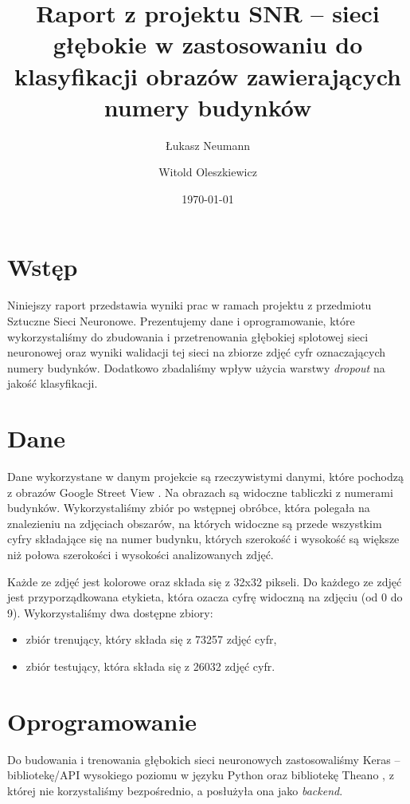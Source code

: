 \documentclass[12pt]{article}
\title{Raport z projektu SNR -- sieci głębokie w zastosowaniu do klasyfikacji obrazów zawierających numery budynków}
\author{
        Łukasz Neumann \\
            \and
        Witold Oleszkiewicz \\
}
\date{\today}
\begin{document}
\maketitle


\section{Wstęp}

Niniejszy raport przedstawia wyniki prac w ramach projektu z przedmiotu Sztuczne Sieci Neuronowe. Prezentujemy dane i oprogramowanie, które wykorzystaliśmy do zbudowania i przetrenowania głębokiej splotowej sieci neuronowej oraz wyniki walidacji tej sieci na zbiorze zdjęć cyfr oznaczających numery budynków. Dodatkowo zbadaliśmy wpływ użycia warstwy \textit{dropout} na jakość klasyfikacji.

\section{Dane}

Dane wykorzystane w danym projekcie są rzeczywistymi danymi, które pochodzą z obrazów Google Street View \cite{dane}. Na obrazach są widoczne tabliczki z numerami budynków. Wykorzystaliśmy zbiór po wstępnej obróbce, która polegała na znalezieniu na zdjęciach obszarów, na których widoczne są przede wszystkim cyfry składające się na numer budynku, których szerokość i wysokość są większe niż połowa szerokości i wysokości analizowanych zdjęć.

Każde ze zdjęć jest kolorowe oraz składa się z 32x32 pikseli. Do każdego ze zdjęć jest przyporządkowana etykieta, która ozacza cyfrę widoczną na zdjęciu (od 0 do 9). Wykorzystaliśmy dwa dostępne zbiory:

\begin{itemize}
\item zbiór trenujący, który składa się z 73257 zdjęć cyfr,
\item zbiór testujący, która składa się z 26032 zdjęć cyfr.
\end{itemize}

\section{Oprogramowanie}

Do budowania i trenowania głębokich sieci neuronowych zastosowaliśmy Keras \cite{keras} -- bibliotekę/API wysokiego poziomu w języku Python oraz bibliotekę Theano \cite{theano}, z której nie korzystaliśmy bezpośrednio, a posłużyła ona jako \textit{backend}. 
\end{document}
